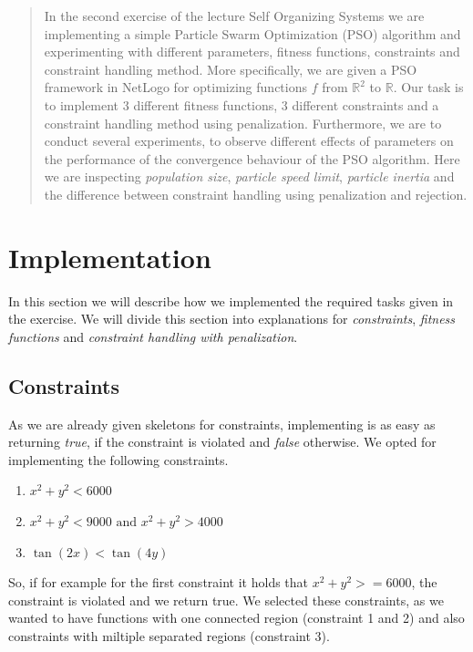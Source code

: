 \documentclass[12pt]{article}
\begin{document}
\maketitle

\begin{abstract}
    In the second exercise of the lecture Self Organizing Systems we are implementing a simple Particle Swarm Optimization (PSO) algorithm and experimenting with different parameters, fitness functions, constraints and constraint handling method.
    More specifically, we are given a PSO framework in NetLogo for optimizing functions $f$ from $\mathbb{R}^2$ to $\mathbb{R}$.
    Our task is to implement 3 different fitness functions, 3 different constraints and a constraint handling method using penalization.
    Furthermore, we are to conduct several experiments, to observe different effects of parameters on the performance of the convergence behaviour of the PSO algorithm.
    Here we are inspecting \textit{population size}, \textit{particle speed limit}, \textit{particle inertia} and the difference between constraint handling using penalization and rejection.
\end{abstract}

\section{Implementation}
In this section we will describe how we implemented the required tasks given in the exercise.
We will divide this section into explanations for \textit{constraints}, \textit{fitness functions} and \textit{constraint handling with penalization}.

\subsection{Constraints}
As we are already given skeletons for constraints, implementing is as easy as returning \textit{true}, if the constraint is violated and \textit{false} otherwise.
We opted for implementing the following constraints.
\begin{enumerate}
        \item $x^2+y^2<6000$
        \item $x^2+y^2<9000\text{ and }x^2+y^2>4000$
        \item $\tan(2x)<\tan(4y)$
\end{enumerate}
So, if for example for the first constraint it holds that $x^2+y^2>=6000$, the constraint is violated and we return true.
We selected these constraints, as we wanted to have functions with one connected region (constraint 1 and 2) and also constraints with miltiple separated regions (constraint 3).
\end{document}
